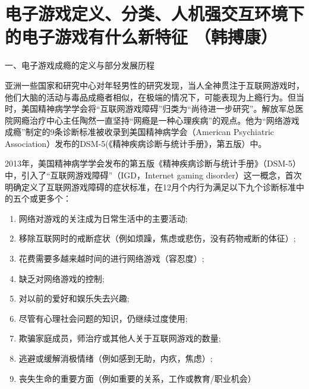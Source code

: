 \color{violet}

 
\section{电子游戏定义、分类、人机强交互环境下的电子游戏有什么新特征  
（韩搏康）
}

一、电子游戏成瘾的定义与部分发展历程 

亚洲一些国家和研究中心对年轻男性的研究发现，当人全神贯注于互联网游戏时，他们大脑的活动与毒品成瘾者相似，在极端的情况下，可能表现为上瘾行为。但当时，美国精神病学学会将“互联网游戏障碍”归类为“尚待进一步研究”。解放军总医院网瘾治疗中心主任陶然一直坚持“网瘾是一种心理疾病”的观点。他为“网络游戏成瘾”制定的9条诊断标准被收录到美国精神病学会（American Psychiatric Association）发布的DSM-5(《精神疾病诊断与统计手册》，第五版）中。

2013年，美国精神病学学会发布的第五版《精神疾病诊断与统计手册》（DSM-5）中，引入了“互联网游戏障碍”（IGD，Internet gaming disorder）这一概念，首次明确定义了互联网游戏障碍的症状标准，在12月个内行为满足以下九个诊断标准中的五个或更多个：
\begin{enumerate}
\item 网络对游戏的关注成为日常生活中的主要活动; 
\item 移除互联网时的戒断症状（例如烦躁，焦虑或悲伤，没有药物戒断的体征）; 
 \item 花费需要多越来越时间的进行网络游戏（容忍度）; 
\item 缺乏对网络游戏的控制;
\item 对以前的爱好和娱乐失去兴趣; 
\item 尽管有心理社会问题的知识，仍继续过度使用; 
\item 欺骗家庭成员，师治疗或其他人关于互联网游戏的数量; 
\item 逃避或缓解消极情绪（例如感到无助，内疚，焦虑）; 
\item 丧失生命的重要方面（例如重要的关系，工作或教育/职业机会）
\end{enumerate}


